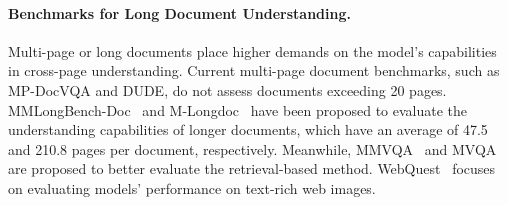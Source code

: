 \vspace{-0.4mm}
\paragraph{Benchmarks for Long Document Understanding.}
Multi-page or long documents place higher demands on the model's capabilities in cross-page understanding. Current multi-page document benchmarks, such as MP-DocVQA and DUDE, do not assess documents exceeding 20 pages. MMLongBench-Doc~\cite{MMLongBench-Doc} and M-Longdoc~\cite{M-Longdoc-arxiv} have been proposed to evaluate the understanding capabilities of longer documents, which have an average of 47.5 and 210.8 pages per document, respectively. Meanwhile, MMVQA~\cite{MMVQA} and MVQA~\cite{MVQA} are proposed to better evaluate the retrieval-based method. WebQuest~\cite{WebQuest} focuses on evaluating models' performance on text-rich web images.

